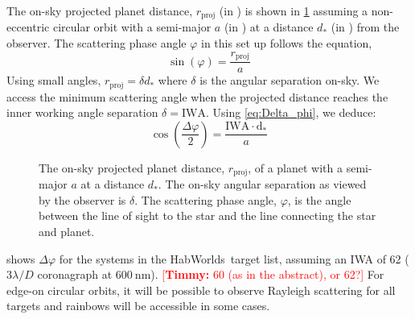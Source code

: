 \documentclass[
    usenatbib,
]{mnras}
\newcommand{\timmy}[1]{\textcolor{red}{[\textbf{Timmy:} #1]}} %
\newcommand{\hwo}{HabWorlds}
\begin{document}
%

The on-sky projected planet distance, $r_\mathrm{proj}$ (in \si{\au}) is shown in \cref{fig:scattering-angle} assuming a non-eccentric circular orbit with a semi-major $a$ (in \si{\au}) at a distance $d_*$ (in \si{\parsec}) from the observer. 
%
The scattering phase angle $\varphi$ in this set up follows the equation,
\begin{equation}
    \sin(\varphi) = \frac{r_\mathrm{proj}}{a}
\end{equation}
%
Using small angles, $r_\mathrm{proj} = \delta d_*$ where $\delta$ is the angular separation on-sky.
%
We access the minimum scattering angle when the projected distance reaches the inner working angle separation $\delta = \mathrm{IWA}$. 
%
Using \cref{eq:Delta_phi}, we deduce:
%
\begin{equation}
    \label{eq:scattering_angle}
    \cos\left(\dfrac{\Delta \varphi}{2}\right) = \frac{\mathrm{IWA \cdot d_*}}{a}
\end{equation}
\begin{figure}
    \centering
    
    \caption{
        The on-sky projected planet distance, $r_\mathrm{proj}$, of a planet with a semi-major $a$ at a distance $d_*$. The on-sky angular separation as viewed by the observer is $\delta$. The scattering phase angle, $\varphi$, is the angle between the line of sight to the star and the line connecting the star and planet.  
    }
    \label{fig:scattering-angle}
\end{figure}

 shows $\Delta \varphi$ for the systems in the \hwo\ target list, assuming an IWA of \SI{62}{\mas} ($3 \lambda / D$ coronagraph at $\SI{600}{\nano\meter}$). 
\timmy{60 (as in the abstract), or 62?}
%
%
For edge-on circular orbits, it will be possible to observe Rayleigh scattering for all targets and rainbows will be accessible in some cases.
\end{document}
